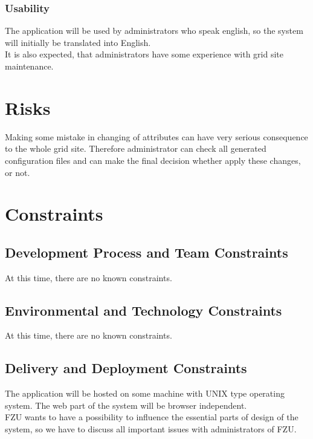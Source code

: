 \documentclass[12pt]{article}
\begin{document}
\subsubsection{Usability}
The application will be used by administrators who speak english, so the system will initially be translated into English.\\
It is also expected, that administrators have some experience with grid site maintenance.


\section{Risks}
Making some mistake in changing of attributes can have very serious consequence to the whole grid site. Therefore administrator can
check all generated configuration files and can make the final decision whether apply these changes, or not.


\section{Constraints}

\subsection{Development Process and Team Constraints}
At this time, there are no known constraints.

\subsection{Environmental and Technology Constraints}
At this time, there are no known constraints.

\subsection{Delivery and Deployment Constraints}
The application will be hosted on some machine with UNIX type operating system. The web part of the system will be browser 
independent.\\
FZU wants to have a possibility to influence the essential parts of design of the system, so we have to discuss all important issues
with administrators of FZU.
\end{document}
